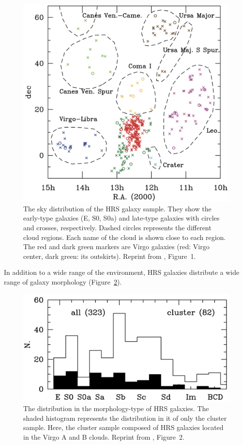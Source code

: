 \begin{figure}[htbp]
	\centering
	\includegraphics[width=.7\linewidth]{Chapter_3/Figures/Boselli2010_Figure1.png}
    \caption[The sky distribution of galaxies in HRS catalog]{\label{fig:Boselli2010_figure1}
        The sky distribution of the HRS galaxy sample.
        They show the early-type galaxies (E, S0, S0a) and late-type galaxies with circles and crosses, respectively.
        Dashed circles represents the different cloud regions. Each name of the cloud is shown close to each region.
        The red and dark green markers are Virgo galaxies (red: Virgo center, dark green: its outskirts).
        Reprint from \citealt{Boselli2010}, Figure~1.
    }
\end{figure}

In addition to a wide range of the environment, HRS galaxies distribute a wide range of galaxy morphology (Figure~\ref{fig:Boselli2010_figure2}).

\begin{figure}[htbp]
	\centering
	\includegraphics[width=.8\linewidth]{Chapter_3/Figures/Boselli2010_Figure2.png}
    \caption[The morphology distribution of HRS samples]{\label{fig:Boselli2010_figure2}
        The distribution in the morphology-type of HRS galaxies.
        The shaded histogram represents the distribution in it of only the cluster sample.
        Here, the cluster sample composed of HRS galaxies located in the Virgo A and B clouds.
        Reprint from \citealt{Boselli2010}, Figure~2.
    }
\end{figure}

